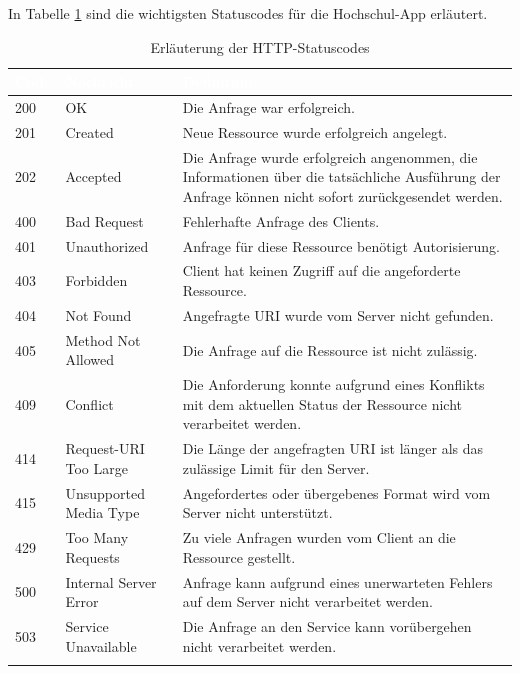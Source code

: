 In Tabelle \ref{tab:status} sind die wichtigsten Statuscodes für die Hochschul-\ac{App} erläutert.
\newpage
  \begin{longtable}[c]{| p{} | p{} | p{} |}
  \hline
  \rowcolor{Gray}
  \textcolor{white}{\textbf{Code}} & \textcolor{white}{\textbf{Nachricht}} & \textcolor{white}{\textbf{Definition}} \\
   \hline
    200 &		  OK						& Die Anfrage war erfolgreich.
    \\ \hline
    \rowcolor{LGray}
    201	&		  Created				& Neue Ressource wurde erfolgreich angelegt.
    \\ \hline
    202	&		  Accepted				& Die Anfrage wurde erfolgreich angenommen, die Informationen über die tatsächliche Ausführung der Anfrage können nicht sofort zurückgesendet werden.
    \\ \hline
    \rowcolor{LGray}
    400	&		  Bad Request			& Fehlerhafte Anfrage des Clients.
    \\ \hline
    401	&		  Unauthorized			& Anfrage für diese Ressource benötigt Autorisierung.
	\\ \hline
	\rowcolor{LGray}
    403	&		  Forbidden				& Client hat keinen Zugriff auf die angeforderte Ressource.
    \\ \hline
    404	&		  Not Found				& Angefragte URI wurde vom Server nicht gefunden.
    \\ \hline
    \rowcolor{LGray}
    405	&		  Method Not Allowed		& Die Anfrage auf die Ressource ist nicht zulässig.
    \\ \hline
    409	&		  Conflict				& Die Anforderung konnte aufgrund eines Konflikts mit dem aktuellen Status der Ressource nicht verarbeitet werden.
    \\ \hline
    \rowcolor{LGray}
    414	&		  Request-URI Too Large	& Die Länge der angefragten \ac{URI} ist länger als das zulässige Limit für den Server.
    \\ \hline
    415	&		  Unsupported Media Type	& Angefordertes oder übergebenes Format wird vom Server nicht unterstützt.
	\\ \hline
	\rowcolor{LGray}
    429	&		  Too Many Requests		& Zu viele Anfragen wurden vom Client an die Ressource gestellt.
    \\ \hline
    500	&		  Internal Server Error	& Anfrage kann aufgrund eines unerwarteten Fehlers auf dem Server nicht verarbeitet werden.
    \\ \hline
    \rowcolor{LGray}
    503	&		  Service Unavailable	& Die Anfrage an den Service kann vorübergehen nicht verarbeitet werden.
    \\ \hline
\caption[HTTP-Statuscodes]{Erläuterung der HTTP-Statuscodes\label{tab:status}} 

  \end{longtable}

